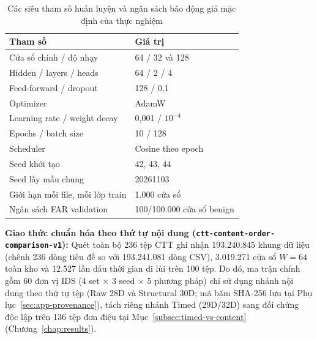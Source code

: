 \documentclass[12pt, a4paper, reqno, oneside]{book}
\DeclareRobustCommand{\code}[1]{\nolinkurl{#1}}
\begin{document}
{\renewcommand{\arraystretch}{0.88}
\begin{table}[htbp]\centering\footnotesize
\caption{Các siêu tham số huấn luyện và ngân sách báo động giả mặc định của thực nghiệm}\label{tab:config}
\begin{tabular}{P{6.5cm}P{6.5cm}}
\toprule
Tham số & Giá trị \\
\midrule
Cửa sổ chính / độ nhạy & 64 / 32 và 128\\
Hidden / layers / heads & 64 / 2 / 4\\
Feed-forward / dropout & 128 / 0,1\\
Optimizer & AdamW\\
Learning rate / weight decay & 0,001 / $10^{-4}$\\
Epochs / batch size & 10 / 128\\
Scheduler & Cosine theo epoch\\
Seed khởi tạo & 42, 43, 44\\
Seed lấy mẫu chung & 20261103\\
Giới hạn mỗi file, mỗi lớp train & 1.000 cửa sổ\\
Ngân sách FAR validation & 100/100.000 cửa sổ benign\\
\bottomrule
\end{tabular}
\end{table}}

\textbf{Giao thức chuẩn hóa theo thứ tự nội dung (\code{ctt-content-order-comparison-v1}):} Quét toàn bộ 236 tệp CTT ghi nhận 193.240.845 khung dữ liệu (chênh 236 dòng tiêu đề so với 193.241.081 dòng CSV), 3.019.271 cửa sổ $W=64$ toàn kho và 12.527 lần dấu thời gian đi lùi trên 100 tệp. Do đó, ma trận chính gồm 60 đơn vị IDS (4 set $\times$ 3 seed $\times$ 5 phương pháp) chỉ sử dụng nhánh nội dung theo thứ tự tệp (Raw 28D và Structural 30D; mã băm SHA-256 lưu tại Phụ lục~\ref{sec:app-provenance}), tách riêng nhánh Timed (29D/32D) sang đối chứng độc lập trên 136 tệp đơn điệu tại Mục~\ref{subsec:timed-vs-content} (Chương~\ref{chap:results}).
\end{document}
